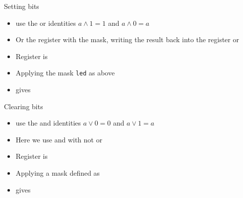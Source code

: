 \documentclass[svgnames,x11names]{beamer}
\begin{document}
\begin{frame}[fragile]{Setting bits}
  \begin{itemize}
  \item use the \alert{or} identities $a \wedge 1 = 1$ and $a \wedge 0 = a$
  \item Or the register with the mask, writing the result back into the register
      or
  \end{itemize}

  \begin{example}
    \begin{itemize}
    \item 
    Register is
    \item Applying the mask \texttt{led} as above
    \item  gives 
    \end{itemize}
  \end{example}
\end{frame}

\begin{frame}[fragile]{Clearing bits}
  \begin{itemize}
  \item use the \alert{and} identities $ a \vee 0 = 0$ and $a \vee 1 = a$
  \item Here we use \alert{and} with \alert{not}
      or
  \end{itemize}

  \begin{example}
    \begin{itemize}
    \item 
    Register is
    \item Applying a mask defined as
    \item gives 
    \end{itemize}
  \end{example}
\end{frame}
\end{document}
